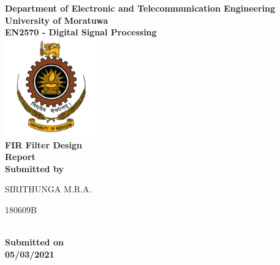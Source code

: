 \documentclass[oneside,11pt,onecolumn,a4paper]{report}
\begin{document}
\begin{titlepage}

\center 

\textbf{\large Department of Electronic and Telecommunication Engineering}\\[0.5cm]
\textbf{\Large University of Moratuwa}\\[1cm]
\textbf{\large EN2570 -  Digital Signal Processing}\\[2cm]

\includegraphics[width=0.3\textwidth]{uomlogo}\\[2cm]

	
\textbf{\Huge {FIR Filter Design}  }\\[2mm]
\textbf{\Huge{Report}}\\[0.5cm]
\vspace{5cm}
\textbf{\large Submitted by}\\[0.5cm]
\begin{minipage}{0.32\textwidth}
	\begin{flushleft}
		{\large SIRITHUNGA M.R.A. }\\[4mm]
		
	\end{flushleft}
\end{minipage}
\hspace{5mm}
\begin{minipage}{0.32\textwidth}
	\begin{flushright}
		{\large 180609B }\\[4mm]
		
	\end{flushright}
\end{minipage}\\[2cm]


\textbf{\large Submitted on}\\[0.1cm]
\textbf{\Large 05/03/2021} 

\vfill
\end{titlepage}
\tableofcontents
\end{document}
